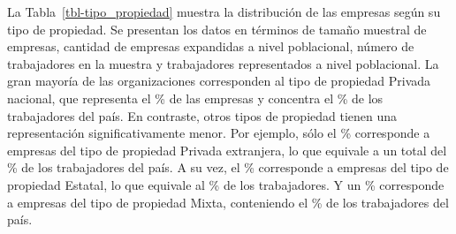 \documentclass[
  11pt,
]{article}
\begin{document}
La Tabla~\ref{tbl-tipo_propiedad} muestra la distribución de las
empresas según su tipo de propiedad. Se presentan los datos en términos
de tamaño muestral de empresas, cantidad de empresas expandidas a nivel
poblacional, número de trabajadores en la muestra y trabajadores
representados a nivel poblacional. La gran mayoría de las organizaciones
corresponden al tipo de propiedad Privada nacional, que representa el
\% de las empresas y concentra el \% de los
trabajadores del país. En contraste, otros tipos de propiedad tienen una
representación significativamente menor. Por ejemplo, sólo el
\% corresponde a empresas del tipo de propiedad Privada
extranjera, lo que equivale a un total del \% de los
trabajadores del país. A su vez, el \% corresponde a empresas
del tipo de propiedad Estatal, lo que equivale al \% de los
trabajadores. Y un \% corresponde a empresas del tipo de
propiedad Mixta, conteniendo el \% de los trabajadores del
país.

\begin{table}

\caption{\label{tbl-tipo_propiedad}Tipo de propiedad de empresas}


\end{table}%
\end{document}
